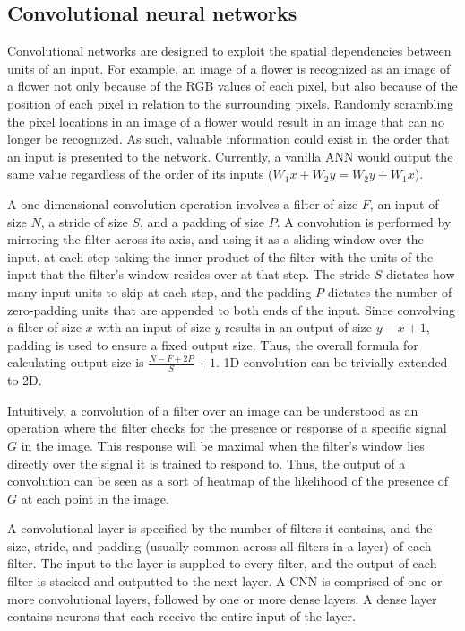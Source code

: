 \documentclass{article} %
\begin{document}
\subsection{Convolutional neural networks}
Convolutional networks are designed to exploit the spatial dependencies between units of an input. For example, an image of a flower is recognized as an image of a flower not only because of the RGB values of each pixel, but also because of the position of each pixel in relation to the surrounding pixels. Randomly scrambling the pixel locations in an image of a flower would result in an image that can no longer be recognized. As such, valuable information could exist in the order that an input is presented to the network. Currently, a vanilla ANN would output the same value regardless of the order of its inputs ($W_{1}x+W_{2}y = W_{2}y+W_{1}x$). 

A one dimensional convolution operation involves a filter of size $F$, an input of size $N$, a stride of size $S$, and a padding of size $P$. A convolution is performed by mirroring the filter across its axis, and using it as a sliding window over the input, at each step taking the inner product of the filter with the units of the input that the filter's window resides over at that step. The stride $S$ dictates how many input units to skip at each step, and the padding $P$ dictates the number of zero-padding units that are appended to both ends of the input. Since convolving a filter of size $x$ with an input of size $y$ results in an output of size $y-x+1$, padding is used to ensure a fixed output size. Thus, the overall formula for calculating output size is $\frac{N-F+2P}{S}+1$. 1D convolution can be trivially extended to 2D. 

Intuitively, a convolution of a filter over an image can be understood as an operation where the filter checks for the presence or response of a specific signal $G$ in the image. This response will be maximal when the filter's window lies directly over the signal it is trained to respond to. Thus, the output of a convolution can be seen as a sort of heatmap of the likelihood of the presence of $G$ at each point in the image. 

A convolutional layer is specified by the number of filters it contains, and the size, stride, and padding (usually common across all filters in a layer) of each filter. The input to the layer is supplied to every filter, and the output of each filter is stacked and outputted to the next layer. A CNN is comprised of one or more convolutional layers, followed by one or more dense layers. A dense layer contains neurons that each receive the entire input of the layer.
\end{document}
